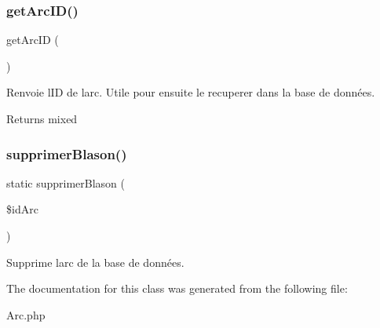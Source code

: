 \subsubsection{\texorpdfstring{get\+Arc\+I\+D()}{getArcID()}}
{\footnotesize\ttfamily get\+Arc\+ID (\begin{DoxyParamCaption}{ }\end{DoxyParamCaption})}

Renvoie l\textquotesingle{}ID de l\textquotesingle{}arc. Utile pour ensuite le recuperer dans la base de données. \begin{DoxyReturn}{Returns}
mixed 
\end{DoxyReturn}
\mbox{\label{class_arc_a1c954ce573dd0b289d87b655bc80234e}} 
\subsubsection{\texorpdfstring{supprimer\+Blason()}{supprimerBlason()}}
{\footnotesize\ttfamily static supprimer\+Blason (\begin{DoxyParamCaption}\item[{}]{\$id\+Arc }\end{DoxyParamCaption})\hspace{0.3cm}{\ttfamily [static]}}

Supprime l\textquotesingle{}arc de la base de données. 

The documentation for this class was generated from the following file\+:\begin{DoxyCompactItemize}
\item 
Arc.\+php\end{DoxyCompactItemize}
